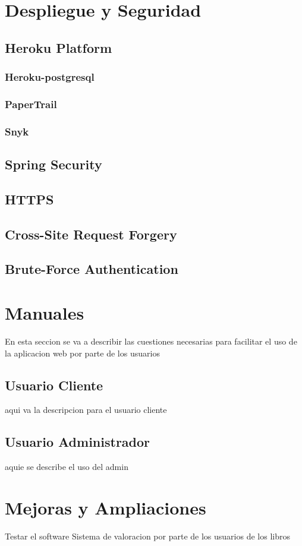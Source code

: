 \documentclass[a4paper]{report}
\begin{document}
    \section{Despliegue y Seguridad}
        \subsection{Heroku Platform}
            \subsubsection{Heroku-postgresql}
            \subsubsection{PaperTrail}
            \subsubsection{Snyk}
        \subsection{Spring Security}
        \subsection{HTTPS}
        \subsection{Cross-Site Request Forgery}
        \subsection{Brute-Force Authentication}

    \section{Manuales}
    En esta seccion se va a describir las cuestiones necesarias para facilitar el uso de la aplicacion web por parte de los usuarios
        \subsection{Usuario Cliente}
    aqui va la descripcion para el usuario cliente
        \subsection{Usuario Administrador}
    aquie se describe el uso del admin

    \section{Mejoras y Ampliaciones}
    Testar el software
    Sistema de valoracion por parte de los usuarios de los libros
\end{document}
